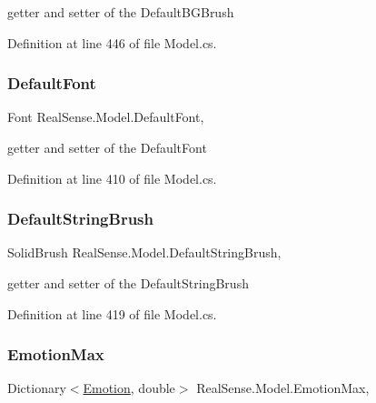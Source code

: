 getter and setter of the Default\+B\+G\+Brush 

Definition at line 446 of file Model.\+cs.

\mbox{\label{class_real_sense_1_1_model_a1e12c6ceac3f412e6b452148b1a97bb1}} 
\subsubsection{\texorpdfstring{Default\+Font}{DefaultFont}}
{\footnotesize\ttfamily Font Real\+Sense.\+Model.\+Default\+Font\hspace{0.3cm}{\ttfamily [get]}, {\ttfamily [set]}}

getter and setter of the Default\+Font 

Definition at line 410 of file Model.\+cs.

\mbox{\label{class_real_sense_1_1_model_aaee076946f30b272e403d39afe033b4e}} 
\subsubsection{\texorpdfstring{Default\+String\+Brush}{DefaultStringBrush}}
{\footnotesize\ttfamily Solid\+Brush Real\+Sense.\+Model.\+Default\+String\+Brush\hspace{0.3cm}{\ttfamily [get]}, {\ttfamily [set]}}

getter and setter of the Default\+String\+Brush 

Definition at line 419 of file Model.\+cs.

\mbox{\label{class_real_sense_1_1_model_ac5454f63dfead405cd1d9c229cf6790f}} 
\subsubsection{\texorpdfstring{Emotion\+Max}{EmotionMax}}
{\footnotesize\ttfamily Dictionary$<$\hyperlink{class_real_sense_1_1_model_a5bf3fde8f53519f7a740d8b4e0399208}{Emotion}, double$>$ Real\+Sense.\+Model.\+Emotion\+Max\hspace{0.3cm}{\ttfamily [get]}, {\ttfamily [set]}}

